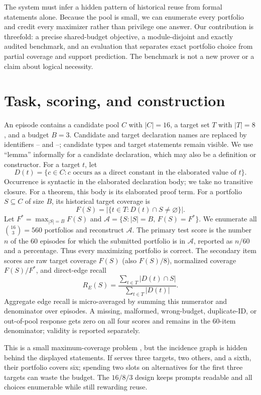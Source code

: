 The system must infer a hidden pattern of historical reuse from formal
statements alone.  Because the pool is small, we can enumerate every portfolio
and credit every maximizer rather than privilege one answer.  Our contribution
is threefold: a precise shared-budget objective, a module-disjoint and exactly
audited \mathlib{} benchmark, and an evaluation that separates exact portfolio
choice from partial coverage and support prediction.  The benchmark is not a
new prover or a claim about logical necessity.

\section{Task, scoring, and construction}

An episode contains a candidate pool $C$ with $|C|=16$, a target set $T$ with
$|T|=8$, and a budget $B=3$.  Candidate and target declaration names are
replaced by identifiers -- and
--; candidate types and target statements remain visible.
We use ``lemma'' informally for a candidate declaration, which may also be a
definition or constructor.
For a target $t$, let
\[
 D(t)=\{c\in C : c\text{ occurs as a direct constant in the elaborated value
 of }t\}.
\]
Occurrence is syntactic in the elaborated declaration body; we take no
transitive closure.  For a theorem, this body is its elaborated proof term.
For a portfolio $S\subseteq C$ of size $B$, its historical target coverage is
\begin{equation}
  F(S)=\bigl|\{t\in T:D(t)\cap S\ne\varnothing\}\bigr|.       \label{eq:coverage}
\end{equation}
Let $F^*=\max_{|S|=B}F(S)$ and
$\mathcal A=\{S:|S|=B,\,F(S)=F^*\}$.  We enumerate all
$\binom{16}{3}=560$ portfolios and reconstruct $\mathcal A$.  The primary test
score is the number $n$ of the 60 episodes for which the submitted portfolio is
in $\mathcal A$, reported as $n/60$ and a percentage.  Thus every maximizing
portfolio is correct.  The secondary item scores are raw target coverage
$F(S)$ (also $F(S)/8$), normalized coverage $F(S)/F^*$, and direct-edge recall
\[
 R_E(S)=\frac{\sum_{t\in T}|D(t)\cap S|}{\sum_{t\in T}|D(t)|}.
\]
Aggregate edge recall is micro-averaged by summing this numerator and
denominator over episodes.
A missing, malformed, wrong-budget, duplicate-ID, or out-of-pool response gets
zero on all four scores and remains in the 60-item denominator; validity is
reported separately.

This is a small maximum-coverage problem \citep{nemhauser1978submodular}, but
the incidence graph is hidden behind the displayed statements.  If 
serves three targets,  two others, and  a sixth, their
portfolio covers six; spending two slots on alternatives for the first three
targets can waste the budget.  The $16/8/3$ design keeps prompts readable and
all choices enumerable while still rewarding reuse.

